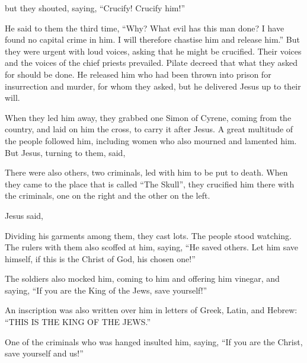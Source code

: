 {but they shouted, saying, “Crucify! Crucify him!”
\par }{\PP {}He said to them the third time, “Why? What evil has this man done? I have found no capital crime in him. I will therefore chastise him and release him.”
But they were urgent with loud voices, asking that he might be crucified. Their voices and the voices of the chief priests prevailed.
Pilate decreed that what they asked for should be done.
He released him who had been thrown into prison for insurrection and murder, for whom they asked, but he delivered Jesus up to their will.
\par }{\PP {}When they led him away, they grabbed one Simon of Cyrene, coming from the country, and laid on him the cross, to carry it after Jesus.
A great multitude of the people followed him, including women who also mourned and lamented him.
But Jesus, turning to them, said,
{}
\par }{\PP {}There were also others, two criminals, led with him to be put to death.
When they came to the place that is called “The Skull”, they crucified him there with the criminals, one on the right and the other on the left.
\par }{\PP {}Jesus said,
{}
\par }{\PP Dividing his garments among them, they cast lots.
The people stood watching. The rulers with them also scoffed at him, saying, “He saved others. Let him save himself, if this is the Christ of God, his chosen one!”
\par }{\PP {}The soldiers also mocked him, coming to him and offering him vinegar,
and saying, “If you are the King of the Jews, save yourself!”
\par }{\PP {}An inscription was also written over him in letters of Greek, Latin, and Hebrew: “THIS IS THE KING OF THE JEWS.”
\par }{\PP {}One of the criminals who was hanged insulted him, saying, “If you are the Christ, save yourself and us!”
}
